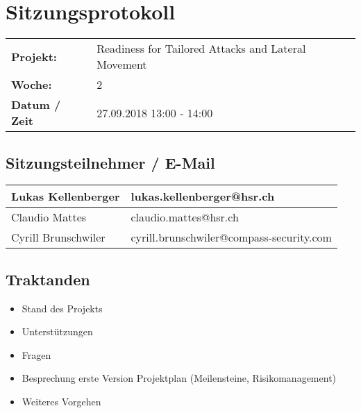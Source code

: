 \newcommand{\TITLE}{Readiness for Tailored Attacks and Lateral Movement Detection}
\newcommand{\REVIEW}{Weekly Meeting}
\newcommand{\VERSION}{0.0}





\section*{Sitzungsprotokoll}

\begin{tabular}{p{4cm} p{12cm}}
    \textbf{Projekt:} & Readiness for Tailored Attacks and Lateral Movement  \\
    \textbf{Woche:} & 2 \\
    \textbf{Datum / Zeit} & 27.09.2018 13:00 - 14:00 \\
\end{tabular}

\subsection*{Sitzungsteilnehmer / E-Mail}
\begin{table}[H]
    \centering
    \begin{tabular}{p{4cm} p{12cm}} \hline
        Lukas Kellenberger & lukas.kellenberger@hsr.ch \\ \hline
        Claudio Mattes & claudio.mattes@hsr.ch \\ \hline
        Cyrill Brunschwiler & cyrill.brunschwiler@compass-security.com \\ \hline
    \end{tabular}
\end{table}

\vspace{1cm}

\subsection*{Traktanden}
\begin{itemize}
    \item Stand des Projekts
    \item Unterstützungen
    \item Fragen
    \item Besprechung erste Version Projektplan (Meilensteine, Risikomanagement)
    \item Weiteres Vorgehen
\end{itemize}

